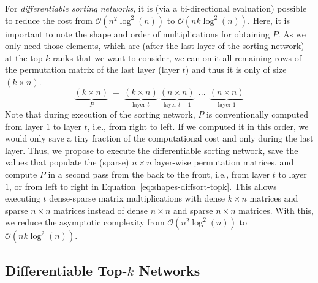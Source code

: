 \documentclass{article}
\begin{document}
For \textit{differentiable sorting networks}, it is (via a bi-directional evaluation) possible to reduce the cost from $\mathcal{O}(n^2 \log^2 (n))$ to $\mathcal{O}(nk \log^2 (n))$. 
Here, it is important to note the shape and order of multiplications for obtaining $P$. 
As we only need those elements, which are (after the last layer of the sorting network) at the top $k$ ranks that we want to consider, we can omit all remaining rows of the permutation matrix of the last layer (layer $t$) and thus it is only of size $(k\times n)$.
\begin{equation}
    \underbrace{(k\times n)}_{\text{$P$}} \  = \ \underbrace{(k\times n)}_{\text{layer $t$}}\ \underbrace{(n\times n)}_{\text{layer $t{-}1$}}\ \ ...\ \ \underbrace{(n\times n)}_{\text{layer $1$}}
    \label{eq:shapes-diffsort-topk}
\end{equation}
Note that during execution of the sorting network, $P$ is conventionally computed from layer $1$ to layer $t$, i.e., from right to left.
If we computed it in this order, we would only save a tiny fraction of the computational cost and only during the last layer.
Thus, we propose to execute the differentiable sorting network, save the values that populate the (sparse) $n\times n$ layer-wise permutation matrices, and compute $P$ in a second pass from the back to the front, i.e., from layer $t$ to layer $1$, or from left to right in Equation~\ref{eq:shapes-diffsort-topk}.
This allows executing $t$ dense-sparse matrix multiplications with dense $k\times n$ matrices and sparse $n\times n$ matrices instead of dense $n\times n$ and sparse $n\times n$ matrices. 
With this, we reduce the asymptotic complexity from $\mathcal{O}(n^2 \log^2 (n))$ to $\mathcal{O}(nk \log^2 (n))$.
 




\subsection{Differentiable Top-$k$ Networks}
\end{document}
